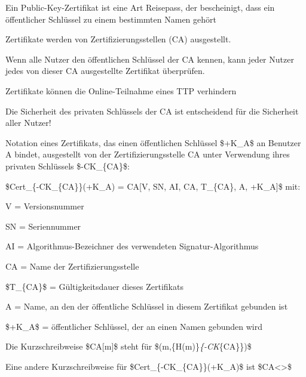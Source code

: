 \documentclass[a4paper]{article}
\begin{document}
\begin{multicols}{3}

      \begin{itemize*}
            \item Ein Public-Key-Zertifikat ist eine Art Reisepass, der bescheinigt,
            dass ein öffentlicher Schlüssel zu einem bestimmten Namen gehört
            \item Zertifikate werden von Zertifizierungsstellen (CA) ausgestellt.
            \item Wenn alle Nutzer den öffentlichen Schlüssel der CA kennen, kann jeder
            Nutzer jedes von dieser CA ausgestellte Zertifikat überprüfen.
            \item Zertifikate können die Online-Teilnahme eines TTP verhindern
            \item Die Sicherheit des privaten Schlüssels der CA ist entscheidend für die
            Sicherheit aller Nutzer!
            \item Notation eines Zertifikats, das einen öffentlichen Schlüssel \$+K\_A\$
            an Benutzer A bindet, ausgestellt von der Zertifizierungsstelle CA
            unter Verwendung ihres privaten Schlüssels \$-CK\_\{CA\}\$:
            \begin{itemize*}
                  \item \$Cert\_\{-CK\_\{CA\}\}(+K\_A) = CA{[}V, SN, AI, CA, T\_\{CA\}, A, +K\_A{]}\$ mit:
                  \begin{itemize*} \item V = Versionsnummer \item SN = Seriennummer \item AI = Algorithmus-Bezeichner des verwendeten Signatur-Algorithmus \item CA = Name der Zertifizierungsstelle \item \$T\_\{CA\}\$ = Gültigkeitsdauer dieses Zertifikats \item A = Name, an den der öffentliche Schlüssel in diesem Zertifikat gebunden ist \item \$+K\_A\$ = öffentlicher Schlüssel, der an einen Namen gebunden wird \end{itemize*}
                  \item Die Kurzschreibweise \$CA{[}m{]}\$ steht für \$(m,\{H(m)\}\emph{\{-CK}\{CA\}\})\$
                  \item Eine andere Kurzschreibweise für \$Cert\_\{-CK\_\{CA\}\}(+K\_A)\$ ist \$CA\textless{}\textgreater\$
            \end{itemize*}
      \end{itemize*}



\end{multicols}
\end{document}
